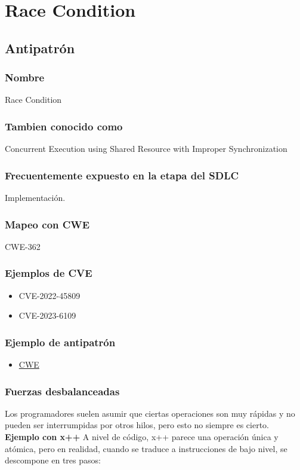 \chapter{Race Condition}
\section{Antipatrón}
\subsection*{Nombre}
Race Condition
\subsection*{Tambien conocido como}
Concurrent Execution using Shared Resource with Improper Synchronization 
\subsection*{Frecuentemente expuesto en la etapa del SDLC}
Implementación.
\subsection*{Mapeo con CWE}
CWE-362
\subsection*{Ejemplos de CVE}
\begin{itemize}
    \item CVE-2022-45809
    \item CVE-2023-6109
\end{itemize}
\subsection*{Ejemplo de antipatrón}
\begin{itemize}
    \item \href{https://cwe.mitre.org/data/definitions/362.html}{CWE}
\end{itemize}
\subsection*{Fuerzas desbalanceadas}
Los programadores suelen asumir que ciertas operaciones son muy rápidas y no pueden ser interrumpidas por otros hilos, pero esto no siempre es cierto.
   \textbf{ Ejemplo con x++}
    A nivel de código, x++ parece una operación única y atómica, pero en realidad, cuando se traduce a instrucciones de bajo nivel, se descompone en tres pasos:
    
